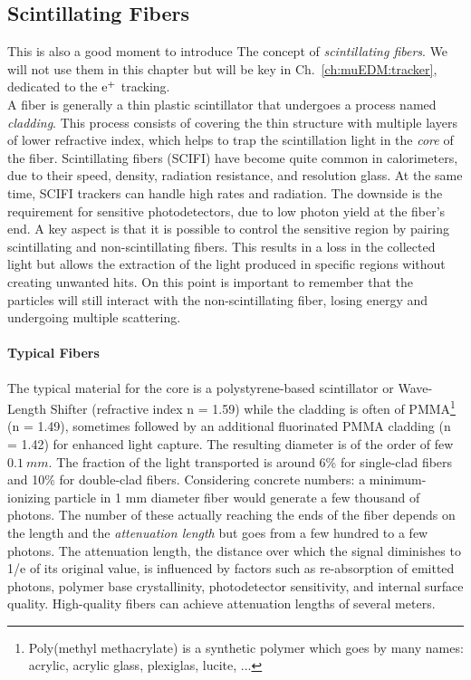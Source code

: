 \begin{refsection}
    \subsection{Scintillating Fibers}
        This is also a good moment to introduce The concept of \textit{scintillating fibers}.
        We will not use them in this chapter but will be key in Ch.~\ref{ch:muEDM:tracker}, dedicated to the $\text{e}^+$ tracking.\\
        A fiber is generally a thin plastic scintillator that undergoes a process named \textit{cladding}.
        This process consists of covering the thin structure with multiple layers of lower refractive index, which helps to trap the scintillation light in the \textit{core} of the fiber.
        Scintillating fibers (SCIFI) have become quite common in calorimeters, due to their speed, density, radiation resistance, and resolution glass. 
        At the same time, SCIFI trackers can handle high rates and radiation. 
        The downside is the requirement for sensitive photodetectors, due to low photon yield at the fiber's end. 
        A key aspect is that it is possible to control the sensitive region by pairing scintillating and non-scintillating fibers. 
        This results in a loss in the collected light but allows the extraction of the light produced in specific regions without creating unwanted hits.
        On this point is important to remember that the particles will still interact with the non-scintillating fiber, losing energy and undergoing multiple scattering.

        \paragraph{Typical Fibers}
        The typical material for the core is a polystyrene-based scintillator or Wave-Length Shifter (refractive index n = 1.59) while the cladding is often of PMMA\footnote{Poly(methyl methacrylate) is a synthetic polymer which goes by many names: acrylic, acrylic glass, plexiglas, lucite, ...} (n = 1.49), sometimes followed by an additional fluorinated PMMA cladding (n = 1.42) for enhanced light capture. 
        The resulting diameter is of the order of few $\SI{0.1}{mm}$.
        The fraction of the light transported is around 6\% for single-clad fibers and 10\% for double-clad fibers. 
        Considering concrete numbers: a minimum-ionizing particle in 1 mm diameter fiber would generate a few thousand of photons.
        The number of these actually reaching the ends of the fiber depends on the length and the \textit{attenuation length} but goes from a few hundred to a few photons.
        The attenuation length, the distance over which the signal diminishes to 1/e of its original value, is influenced by factors such as re-absorption of emitted photons, polymer base crystallinity, photodetector sensitivity, and internal surface quality. 
        High-quality fibers can achieve attenuation lengths of several meters.


\end{refsection}
